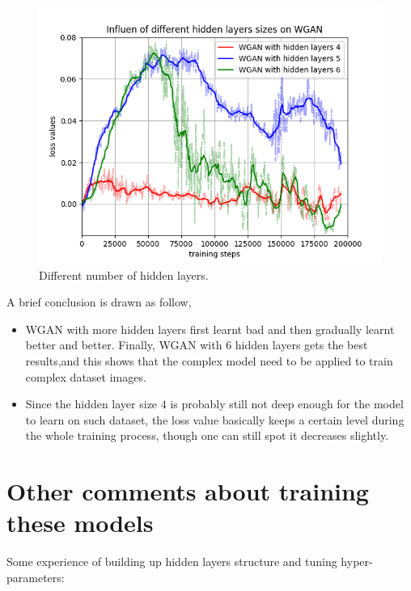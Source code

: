 \documentclass[12pt,letterpaper]{article}
\begin{document}
\begin{figure}[h]
    \centering
    \includegraphics[width=.5\linewidth]{WGAN_CIFAR_hidden.png}
    \caption{\small Different number of hidden layers.}
    \label{fig:wgen_hidden_CIFAR}
\end{figure}


A brief conclusion is drawn as follow,
\begin{itemize}
    \item WGAN with more hidden layers first learnt bad and then gradually learnt better and better. Finally, WGAN with 6 hidden layers gets the best results,and this shows that the complex model need to be applied to train complex dataset images.
    \item Since the hidden layer size $4$ is probably still not deep enough for the model to learn on such dataset, the loss value basically keeps a certain level during the whole training process, though one can still spot it decreases slightly.
\end{itemize}


\section{Other comments about training these models}

Some experience of building up hidden layers structure and tuning hyper-parameters:
\end{document}
